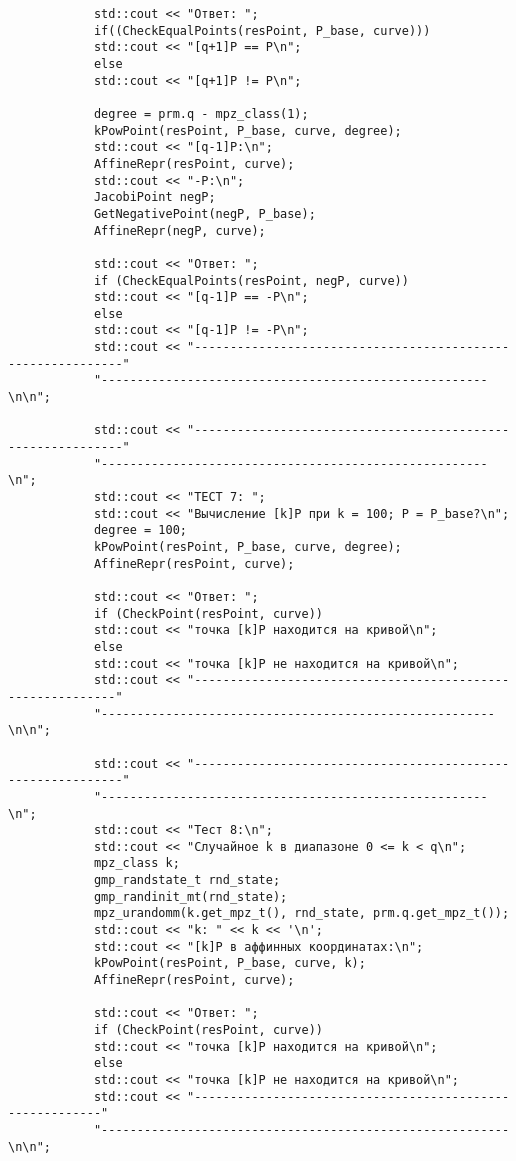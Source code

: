 \documentclass[a4paper,12pt]{article}
\begin{document}
\begin{verbatim}
			std::cout << "Ответ: ";
			if((CheckEqualPoints(resPoint, P_base, curve)))
			std::cout << "[q+1]P == P\n";
			else
			std::cout << "[q+1]P != P\n";
			
			degree = prm.q - mpz_class(1);
			kPowPoint(resPoint, P_base, curve, degree);
			std::cout << "[q-1]P:\n";
			AffineRepr(resPoint, curve);
			std::cout << "-P:\n";
			JacobiPoint negP;
			GetNegativePoint(negP, P_base);
			AffineRepr(negP, curve);
			
			std::cout << "Ответ: ";
			if (CheckEqualPoints(resPoint, negP, curve))
			std::cout << "[q-1]P == -P\n";
			else
			std::cout << "[q-1]P != -P\n";
			std::cout << "------------------------------------------------------------"
			"------------------------------------------------------\n\n";
			
			std::cout << "------------------------------------------------------------"
			"------------------------------------------------------\n";
			std::cout << "ТECT 7: ";
			std::cout << "Вычисление [k]P при k = 100; P = P_base?\n";
			degree = 100;
			kPowPoint(resPoint, P_base, curve, degree);
			AffineRepr(resPoint, curve);
			
			std::cout << "Ответ: ";
			if (CheckPoint(resPoint, curve))
			std::cout << "точка [k]P находится на кривой\n";
			else
			std::cout << "точка [k]P не находится на кривой\n";
			std::cout << "-----------------------------------------------------------"
			"-------------------------------------------------------\n\n";
			
			std::cout << "------------------------------------------------------------"
			"------------------------------------------------------\n";
			std::cout << "Тест 8:\n";
			std::cout << "Случайное k в диапазоне 0 <= k < q\n";
			mpz_class k;
			gmp_randstate_t rnd_state;
			gmp_randinit_mt(rnd_state);
			mpz_urandomm(k.get_mpz_t(), rnd_state, prm.q.get_mpz_t());
			std::cout << "k: " << k << '\n';
			std::cout << "[k]P в аффинных координатах:\n";
			kPowPoint(resPoint, P_base, curve, k);
			AffineRepr(resPoint, curve);
			
			std::cout << "Ответ: ";
			if (CheckPoint(resPoint, curve))
			std::cout << "точка [k]P находится на кривой\n";
			else
			std::cout << "точка [k]P не находится на кривой\n";
			std::cout << "---------------------------------------------------------"
			"---------------------------------------------------------\n\n";
			

\end{verbatim}
\end{document}
